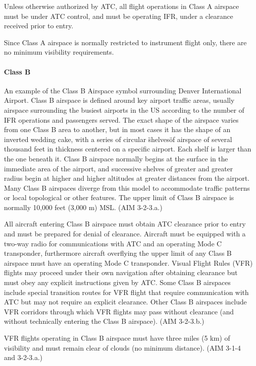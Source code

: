 Unless otherwise authorized by ATC, all flight operations in Class A airspace must be under ATC control, and must be operating IFR, under a clearance received prior to entry.

Since Class A airspace is normally restricted to instrument flight only, there are no minimum visibility requirements.

\paragraph{Class B}
An example of the Class B Airspace symbol surrounding Denver International Airport.
Class B airspace is defined around key airport traffic areas, usually airspace surrounding the busiest airports in the US according to the number of IFR operations and passengers served. The exact shape of the airspace varies from one Class B area to another, but in most cases it has the shape of an inverted wedding cake, with a series of circular \"shelves\" of airspace of several thousand feet in thickness centered on a specific airport. Each shelf is larger than the one beneath it. Class B airspace normally begins at the surface in the immediate area of the airport, and successive shelves of greater and greater radius begin at higher and higher altitudes at greater distances from the airport. Many Class B airspaces diverge from this model to accommodate traffic patterns or local topological or other features. The upper limit of Class B airspace is normally 10,000 feet (3,000 m) MSL. (AIM 3-2-3.a.)

All aircraft entering Class B airspace must obtain ATC clearance prior to entry and must be prepared for denial of clearance. Aircraft must be equipped with a two-way radio for communications with ATC and an operating Mode C transponder, furthermore aircraft overflying the upper limit of any Class B airspace must have an operating Mode C transponder. Visual Flight Rules (VFR) flights may proceed under their own navigation after obtaining clearance but must obey any explicit instructions given by ATC. Some Class B airspaces include special transition routes for VFR flight that require communication with ATC but may not require an explicit clearance. Other Class B airspaces include VFR corridors through which VFR flights may pass without clearance (and without technically entering the Class B airspace). (AIM 3-2-3.b.)

VFR flights operating in Class B airspace must have three miles (5 km) of visibility and must remain clear of clouds (no minimum distance). (AIM 3-1-4 and 3-2-3.a.)

